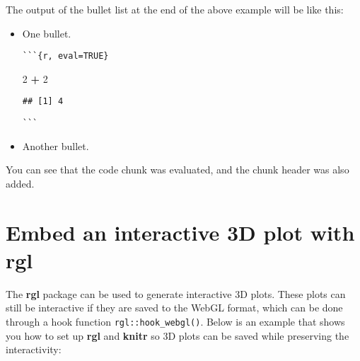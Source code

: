 \documentclass[
  11pt,
]{krantz}
\newenvironment{Shaded}{\begin{snugshade}}{\end{snugshade}}
\newcommand{\BaseNTok}[1]{\textcolor[rgb]{0.06,0.06,0.06}{#1}}
\newcommand{\DecValTok}[1]{\textcolor[rgb]{0.06,0.06,0.06}{#1}}
\newcommand{\NormalTok}[1]{#1}
\newcommand{\OperatorTok}[1]{\textcolor[rgb]{0.43,0.43,0.43}{\textbf{#1}}}
\newcommand{\StringTok}[1]{\textcolor[rgb]{0.5,0.5,0.5}{#1}}
\renewenvironment{quote}{\begin{VF}}{\end{VF}}
\begin{document}
The output of the bullet list at the end of the above example will be like this:

\begin{quote}
\begin{itemize}
\item
  One bullet.

\begin{verbatim}
```{r, eval=TRUE}
\end{verbatim}

\begin{Shaded}
\begin{Highlighting}[]
\DecValTok{2} \OperatorTok{+}\StringTok{ }\DecValTok{2}
\end{Highlighting}
\end{Shaded}

\begin{verbatim}
## [1] 4
\end{verbatim}

\begin{verbatim}
```
\end{verbatim}
\item
  Another bullet.
\end{itemize}
\end{quote}

You can see that the code chunk was evaluated, and the chunk header was also added.

\hypertarget{rgl-3d}{%
\section{Embed an interactive 3D plot with rgl}\label{rgl-3d}}

The \textbf{rgl} package can be used to generate interactive 3D plots. These plots can still be interactive if they are saved to the WebGL format, which can be done through a hook function \texttt{rgl::hook\_webgl()}. Below is an example that shows you how to set up \textbf{rgl} and \textbf{knitr} so 3D plots can be saved while preserving the interactivity:

\begin{Shaded}
\end{Shaded}
\end{document}
